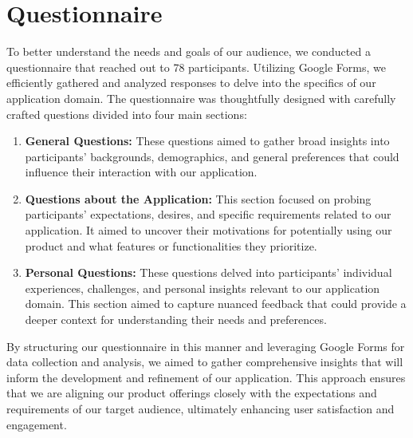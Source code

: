 \section{Questionnaire}
To better understand the needs and goals of our audience, we conducted a questionnaire that reached out to 78 participants. Utilizing Google Forms, we efficiently gathered and analyzed responses to delve into the specifics of our application domain. The questionnaire was thoughtfully designed with carefully crafted questions divided into four main sections:

\begin{enumerate}
	\item \textbf{General Questions:}
	These questions aimed to gather broad insights into participants' backgrounds, demographics, and general preferences that could influence their interaction with our application.
	
	\item \textbf{Questions about the Application:}
	This section focused on probing participants' expectations, desires, and specific requirements related to our application. It aimed to uncover their motivations for potentially using our product and what features or functionalities they prioritize.
	
	\item \textbf{Personal Questions:}
	These questions delved into participants' individual experiences, challenges, and personal insights relevant to our application domain. This section aimed to capture nuanced feedback that could provide a deeper context for understanding their needs and preferences.
	
\end{enumerate}

By structuring our questionnaire in this manner and leveraging Google Forms for data collection and analysis, we aimed to gather comprehensive insights that will inform the development and refinement of our application. This approach ensures that we are aligning our product offerings closely with the expectations and requirements of our target audience, ultimately enhancing user satisfaction and engagement.\\
\clearpage
